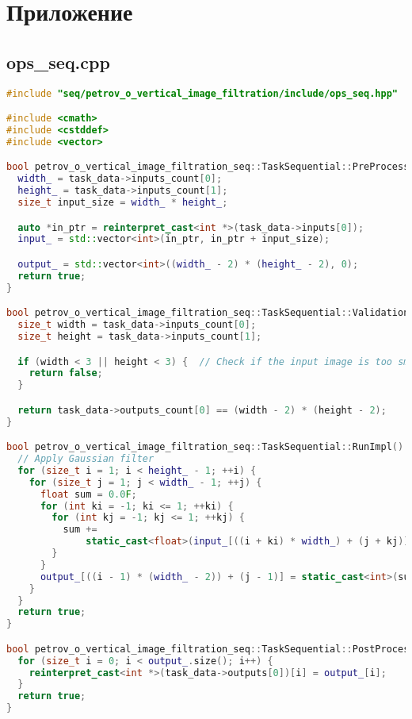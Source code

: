 \documentclass[12pt,a4paper]{extarticle}
\newcommand{\appendixsection}[1]{%
	\clearpage
	\section*{\centering Приложение #1}
	\addcontentsline{toc}{section}{Приложение #1}
}
\begin{document}
\newpage
\appendixsection{}

\subsection{ops\_seq.cpp}
\begin{lstlisting}[language=C++]
#include "seq/petrov_o_vertical_image_filtration/include/ops_seq.hpp"

#include <cmath>
#include <cstddef>
#include <vector>

bool petrov_o_vertical_image_filtration_seq::TaskSequential::PreProcessingImpl() {
  width_ = task_data->inputs_count[0];
  height_ = task_data->inputs_count[1];
  size_t input_size = width_ * height_;

  auto *in_ptr = reinterpret_cast<int *>(task_data->inputs[0]);
  input_ = std::vector<int>(in_ptr, in_ptr + input_size);

  output_ = std::vector<int>((width_ - 2) * (height_ - 2), 0);
  return true;
}

bool petrov_o_vertical_image_filtration_seq::TaskSequential::ValidationImpl() {
  size_t width = task_data->inputs_count[0];
  size_t height = task_data->inputs_count[1];

  if (width < 3 || height < 3) {  // Check if the input image is too small
    return false;
  }

  return task_data->outputs_count[0] == (width - 2) * (height - 2);
}

bool petrov_o_vertical_image_filtration_seq::TaskSequential::RunImpl() {
  // Apply Gaussian filter
  for (size_t i = 1; i < height_ - 1; ++i) {
    for (size_t j = 1; j < width_ - 1; ++j) {
      float sum = 0.0F;
      for (int ki = -1; ki <= 1; ++ki) {
        for (int kj = -1; kj <= 1; ++kj) {
          sum +=
              static_cast<float>(input_[((i + ki) * width_) + (j + kj)]) * gaussian_kernel_[((ki + 1) * 3) + (kj + 1)];
        }
      }
      output_[((i - 1) * (width_ - 2)) + (j - 1)] = static_cast<int>(sum);
    }
  }
  return true;
}

bool petrov_o_vertical_image_filtration_seq::TaskSequential::PostProcessingImpl() {
  for (size_t i = 0; i < output_.size(); i++) {
    reinterpret_cast<int *>(task_data->outputs[0])[i] = output_[i];
  }
  return true;
}
\end{lstlisting}
\end{document}
